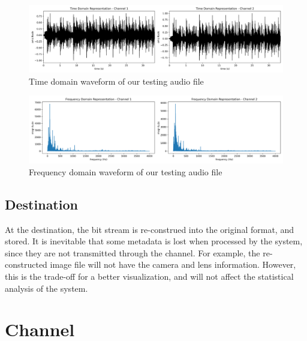 \documentclass{article}
\begin{document}
\begin{figure}[htb]
    \centering
    \includegraphics[width=\textwidth]{../Result/Linear/wav-time-domain-TX.png}
    \caption{Time domain waveform of our testing audio file}
    \label{fig:our-audio-time-domain}
\end{figure}

\begin{figure}[htb]
    \centering
    \includegraphics[width=\textwidth]{../Result/Linear/wav-frequency-domain-TX.png}
    \caption{Frequency domain waveform of our testing audio file}
    \label{fig:our-audio-frequency-domain}
\end{figure}







\subsection{Destination}
At the destination, the bit stream is re-construed into the original format, and stored. 
It is inevitable that some metadata is lost when processed by the system, since they are not transmitted through the channel.
For example, the re-constructed image file will not have the camera and lens information. 
However, this is the trade-off for a better visualization, and will not affect the statistical analysis of the system.








\section{Channel}
\end{document}
